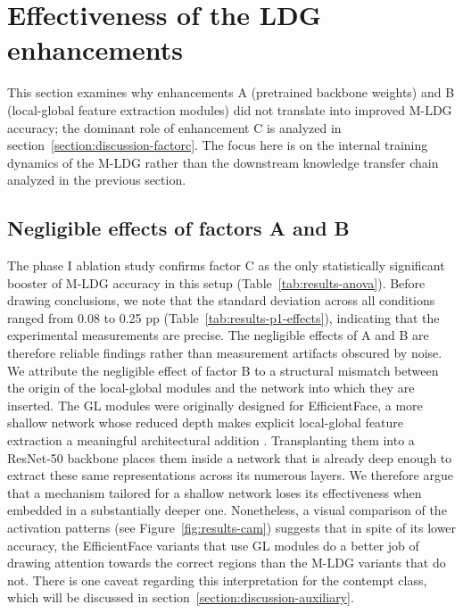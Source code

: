 \section{Effectiveness of the LDG enhancements}
\label{section:discussion-enhancements}

This section examines why enhancements A (pretrained backbone weights) and B (local-global feature extraction modules) did not translate into improved M-LDG accuracy; the dominant role of enhancement C is analyzed in section~\ref{section:discussion-factorc}. The focus here is on the internal training dynamics of the M-LDG rather than the downstream knowledge transfer chain analyzed in the previous section.

\subsection{Negligible effects of factors A and B}
\label{section:discussion-factorab}

The phase I ablation study confirms factor C as the only statistically significant booster of M-LDG accuracy in this setup (Table~\ref{tab:results-anova}). Before drawing conclusions, we note that the standard deviation across all conditions ranged from 0.08 to 0.25 pp (Table~\ref{tab:results-p1-effects}), indicating that the experimental measurements are  precise. The negligible effects of A and B are therefore reliable findings rather than measurement artifacts obscured by noise.\\

We attribute the negligible effect of factor B to a structural mismatch between the origin of the local-global modules and the network into which they are inserted. The GL modules were originally designed for EfficientFace, a more shallow network whose reduced depth makes explicit local-global feature extraction a meaningful architectural addition \cite{eff-face2021}. Transplanting them into a ResNet-50 backbone places them inside a network that is already deep enough to  extract these same representations across its numerous layers. We therefore argue that a mechanism tailored for a shallow network loses its effectiveness when embedded in a substantially deeper one. Nonetheless, a visual comparison of the activation patterns (see Figure~\ref{fig:results-cam}) suggests that in spite of its lower accuracy, the EfficientFace variants that use GL modules do a better job of drawing attention towards the correct regions than the M-LDG variants that do not. There is one caveat regarding this interpretation for the contempt class, which will be discussed in section~\ref{section:discussion-auxiliary}.\\

